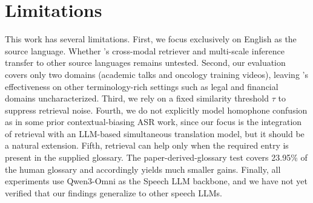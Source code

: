 \section*{Limitations}

This work has several limitations. 
First, we focus exclusively on English as the source language. Whether \method's cross-modal retriever and multi-scale inference transfer to other source languages remains untested. 
Second, our evaluation covers only two domains (academic talks and oncology training videos), leaving \method's effectiveness on other terminology-rich settings such as legal and financial domains uncharacterized. 
Third, we rely on a fixed similarity threshold $\tau$ to suppress retrieval noise.
Fourth, we do not explicitly model homophone confusion as in some prior contextual-biasing ASR work, since our focus is the integration of retrieval with an LLM-based simultaneous translation model, but it should be a natural extension. 
Fifth, retrieval can help only when the required entry is present in the supplied glossary. The paper-derived-glossary test covers 23.95\% of the human glossary and accordingly yields much smaller gains. 
Finally, all experiments use Qwen3-Omni as the Speech LLM backbone, and we have not yet verified that our findings generalize to other speech LLMs.
